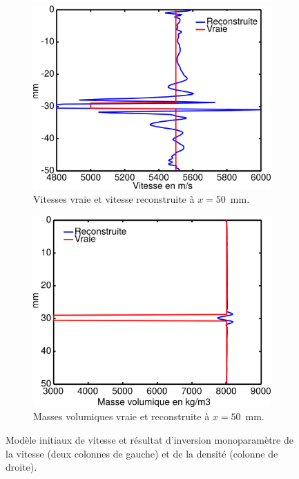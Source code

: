 \begin{figure}[p]
\begin{changemargin}{-2cm}{-2cm}
\begin{subfigure}[b]{0.29\textwidth}
			\includegraphics[width=\textwidth]{img/mono_param/coupe_vp_mono_smooth_vert.png}
			\caption{Vitesses vraie et vitesse reconstruite à $x=50$~mm.}
		\end{subfigure}
		\begin{subfigure}[b]{0.29\textwidth}
			\includegraphics[width=\textwidth]{img/mono_param/coupe_rho_mono_vert.png}
			\caption{Masses volumiques vraie et reconstruite à $x=50$~mm.}
		\end{subfigure}
		\caption{\label{app:inv_mono} Modèle initiaux de vitesse et résultat d'inversion monoparamètre de la vitesse (deux colonnes de gauche) et de la densité (colonne de droite).}
	\end{changemargin}
	\end{figure}
